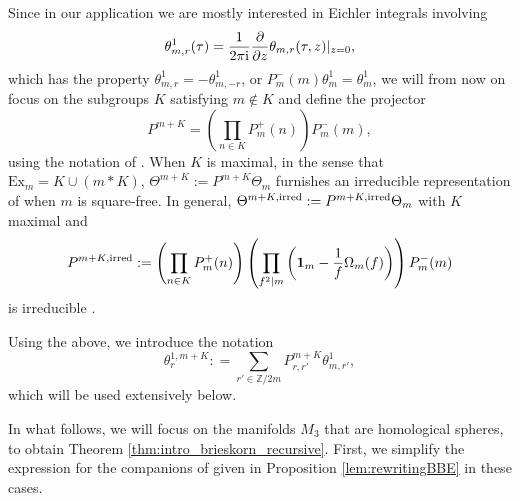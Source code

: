 \documentclass[10pt,a4paper]{amsart}
\def\BZ{\mathbb{Z}}
\def\bv{{\vec{\underline{b}}}}
\theoremstyle{definition}
\numberwithin{equation}{section}
\begin{document}
Since in our application we are mostly interested in Eichler integrals involving \[\theta^1_{m,r}(\tau) = \frac{1}{2\pi {\rm i}}\frac{\partial}{\partial z} \theta_{m,r}(\tau,z)\lvert_{z=0},\] which has the property $\theta^1_{m,r} = -\theta^1_{m,-r} $, or $P^-_m(m)\theta^1_{m}=\theta^1_{m}$, we will from now on focus on the subgroups $K$ satisfying $m\not\in K$ and define the projector
\begin{equation}\label{dfn:projB}
P^{m+K} = \left(\prod_{n\in K}P^+_m(n)\right)
P^-_m(m),
\end{equation}
using the notation of \cite{cheng20193d}. When $K$ is maximal, in the sense that $\mathrm{Ex}_m = K\cup (m\ast K)$, $\Theta^{m+K}:=P^{m+K} \Theta_m$ furnishes an irreducible representation of \smash{$\widetilde{{\rm SL}_2}(\BZ)$} when $m$ is square-free. In general, $\Theta^{m+K,{\rm irred}}:=P^{m+K,{\rm irred}} \Theta_m$ with
$K$ maximal and
\begin{equation}\label{irred_weil}
P^{m+K, {\rm irred}} := \left(\prod_{n\in K}P^+_m(n)\right) \left(
\prod_{f^2|m}\left(\mathbf{1}_m-\frac{1}{f} \Omega_m(f) \right)
\right)
P^-_m(m)
\end{equation}
is irreducible \cite{SkoruppaThesis, 2007arXiv0707.0718S}.

Using the above, we introduce the notation
\begin{equation}\label{WeylorbitSU2}
 \theta_r^{1,m+K}: =\sum_{r'\in\BZ/2m} P^{m+K}_{r,r'}\theta^1_{m,r'},
\end{equation}
which will be used extensively below.

In what follows, we will focus on the manifolds $M_3$ that are homological spheres, to obtain Theorem \ref{thm:intro_brieskorn_recursive}. First, we simplify the expression for the companions of \smash{$\widehat Z^{{\rm SU}(3)}_\bv(M_3)$} given in Proposition \ref{lem:rewritingBBE} in these cases.
\end{document}
